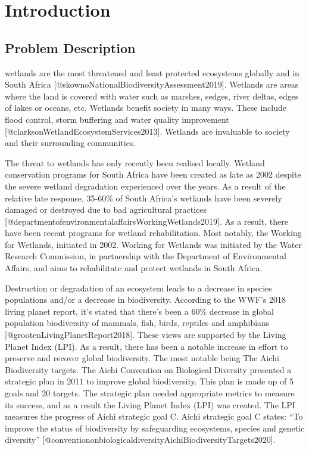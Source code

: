 \documentclass[
]{article}
\author{}
\date{\vspace{-2.5em}}
\begin{document}
\hypertarget{introduction}{%
\section{Introduction}\label{introduction}}

\hypertarget{problem-description}{%
\subsection{Problem Description}\label{problem-description}}

wetlands are the most threatened and least protected ecosystems globally
and in South Africa {[}@skownoNationalBiodiversityAssessment2019{]}.
Wetlands are areas where the land is covered with water such as marshes,
sedges, river deltas, edges of lakes or oceans, etc. Wetlands benefit
society in many ways. These include flood control, storm buffering and
water quality improvement {[}@clarksonWetlandEcosystemServices2013{]}.
Wetlands are invaluable to society and their surrounding communities.

The threat to wetlands has only recently been realised locally. Wetland
conservation programs for South Africa have been created as late as 2002
despite the severe wetland degradation experienced over the years. As a
result of the relative late response, 35-60\% of South Africa's wetlands
have been severely damaged or destroyed due to bad agricultural
practices {[}@departmentofenvironmentalaffairsWorkingWetlands2019{]}. As
a result, there have been recent programs for wetland rehabilitation.
Most notably, the Working for Wetlands, initiated in 2002. Working for
Wetlands was initiated by the Water Research Commission, in partnership
with the Department of Environmental Affairs, and aims to rehabilitate
and protect wetlands in South Africa.

Destruction or degradation of an ecosystem leads to a decrease in
species populations and/or a decrease in biodiversity. According to the
WWF's 2018 living planet report, it's stated that there's been a 60\%
decrease in global population biodiversity of mammals, fish, birds,
reptiles and amphibians {[}@grootenLivingPlanetReport2018{]}. These
views are supported by the Living Planet Index (LPI). As a result, there
has been a notable increase in effort to preserve and recover global
biodiversity. The most notable being The Aichi Biodiversity targets. The
Aichi Convention on Biological Diversity presented a strategic plan in
2011 to improve global biodiversity. This plan is made up of 5 goals and
20 targets. The strategic plan needed appropriate metrics to measure its
success, and as a result the Living Planet Index (LPI) was created. The
LPI measures the progress of Aichi strategic goal C. Aichi strategic
goal C states: ``To improve the status of biodiversity by safeguarding
ecosystems, species and genetic diversity''
{[}@conventiononbiologicaldiversityAichiBiodiversityTargets2020{]}.
\end{document}
